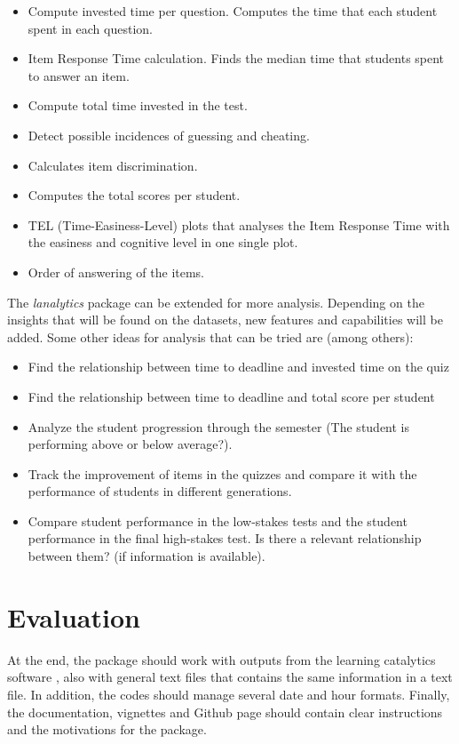 \documentclass{article}
\begin{document}
\begin{itemize}
\item Compute invested time per question. Computes the time that each student spent in each question.
\item Item Response Time calculation. Finds the median time that students spent to answer an item. 
\item Compute total time invested in the test. 
\item Detect possible incidences of guessing and cheating.
\item Calculates item discrimination.
\item Computes the total scores per student.
\item TEL (Time-Easiness-Level) plots that analyses the Item Response Time with the easiness and cognitive level in one single plot.
\item Order of answering of the items.
\end{itemize}

The \textit{lanalytics} package can be extended for more analysis. Depending on the insights that will be found on the datasets, new features and capabilities will be added. Some other ideas for analysis that can be tried are (among others):

\begin{itemize}
\item Find the relationship between time to deadline and invested time on the quiz
\item Find the relationship between time to deadline and total score per student
\item Analyze the student progression through the semester (The student is performing above or below average?).
\item Track the improvement of items in the quizzes and compare it with the performance of students in different generations.
\item Compare student performance in the low-stakes tests and the student performance in the final high-stakes test. Is there a relevant relationship between them? (if information is available).
\end{itemize}


\section*{Evaluation}
At the end, the package should work with outputs from the learning catalytics software \cite{Schell2013}, also with general text files that contains the same information in a text file. In addition, the codes should manage several date and hour formats. Finally, the documentation, vignettes and Github page should contain clear instructions and the motivations for the package. 
\end{document}
